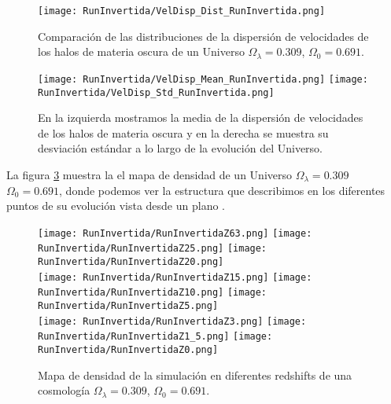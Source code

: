 \begin{figure}[H]
    \centering
    \texttt{[image: RunInvertida/VelDisp\_Dist\_RunInvertida.png]}
    \caption[Distribución de la dispersión de velocidades de un Universo $\Omega_\lambda = 0.309 $, $\Omega_0 = 0.691$]{\footnotesize Comparación de las distribuciones de la dispersión de velocidades de los halos de materia oscura de un Universo $\Omega_\lambda = 0.309 $, $\Omega_0 = 0.691$.}
    \label{fig:Invertida-VelDispDist}
\end{figure}

\begin{figure}[H]
    \centering
    \texttt{[image: RunInvertida/VelDisp\_Mean\_RunInvertida.png]}
    \texttt{[image: RunInvertida/VelDisp\_Std\_RunInvertida.png]}
    \caption[Media y desviación estándar de la dispersión de velocidades de un Universo $\Omega_\lambda = 0.309 $, $\Omega_0 = 0.691$]{\footnotesize En la izquierda mostramos la media de la dispersión de velocidades de los halos de materia oscura y en la derecha se muestra su desviación estándar a lo largo de la evolución del Universo.}
    \label{fig:Invertida-VelDispStats}
\end{figure}

La figura \ref{fig:Invertida-DensityMap} muestra la el mapa de densidad de un Universo $\Omega_\lambda = 0.309 $ $\Omega_0 = 0.691$, donde podemos ver la estructura que describimos  en los diferentes puntos de su evolución vista desde un plano .
\begin{figure}[H]
    \centering

    \texttt{[image: RunInvertida/RunInvertidaZ63.png]}   %
    \texttt{[image: RunInvertida/RunInvertidaZ25.png]}   %
    \texttt{[image: RunInvertida/RunInvertidaZ20.png]}   %
    \\
    \texttt{[image: RunInvertida/RunInvertidaZ15.png]}   %
    \texttt{[image: RunInvertida/RunInvertidaZ10.png]}   %
    \texttt{[image: RunInvertida/RunInvertidaZ5.png]}    %
    \\
    \texttt{[image: RunInvertida/RunInvertidaZ3.png]}    %
    \texttt{[image: RunInvertida/RunInvertidaZ1\_5.png]}  %
    \texttt{[image: RunInvertida/RunInvertidaZ0.png]}    %
    \caption[Mapa de densidad de un Universo $\Omega_\lambda = 0.309 $, $\Omega_0 = 0.691$ en en diferentes redshift]{ \footnotesize Mapa de densidad de la simulación en diferentes redshifts de una cosmología $\Omega_\lambda = 0.309 $, $\Omega_0 = 0.691$. }
    \label{fig:Invertida-DensityMap}
\end{figure}

